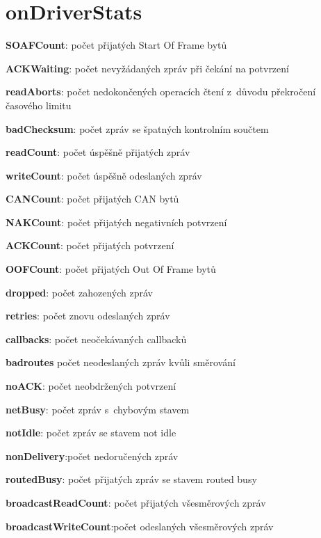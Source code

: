 \documentclass[thesis=M,czech]{FITthesis}[2012/06/26]
\begin{document}
\section{onDriverStats}
\begin{description}
 \item \textbf{SOAFCount}: počet přijatých Start Of Frame bytů
 \item \textbf{ACKWaiting}: počet nevyžádaných zpráv při čekání na potvrzení
 \item \textbf{readAborts}: počet nedokončených operacích čtení z~důvodu překročení časového limitu
 \item \textbf{badChecksum}: počet zpráv se špatných kontrolním součtem
 \item \textbf{readCount}: počet úspěšně přijatých zpráv
 \item \textbf{writeCount}: počet úspěšně odeslaných zpráv
 \item \textbf{CANCount}: počet přijatých CAN bytů
 \item \textbf{NAKCount}: počet přijatých negativních potvrzení
 \item \textbf{ACKCount}: počet přijatých potvrzení
 \item \textbf{OOFCount}: počet přijatých Out Of Frame bytů
 \item \textbf{dropped}: počet zahozených zpráv 
 \item \textbf{retries}: počet znovu odeslaných zpráv
 \item \textbf{callbacks}: počet neočekávaných callbacků
 \item \textbf{badroutes} počet neodeslaných zpráv kvůli směrování
 \item \textbf{noACK}: počet neobdržených potvrzení
 \item \textbf{netBusy}: počet zpráv s~chybovým stavem
 \item \textbf{notIdle}: počet zpráv se stavem not idle
 \item \textbf{nonDelivery}:počet nedoručených zpráv
 \item \textbf{routedBusy}:  počet přijatých zpráv se stavem routed busy
 \item \textbf{broadcastReadCount}: počet přijatých všesměrových zpráv
 \item \textbf{broadcastWriteCount}:počet odeslaných všesměrových zpráv
\end{description}
\end{document}
